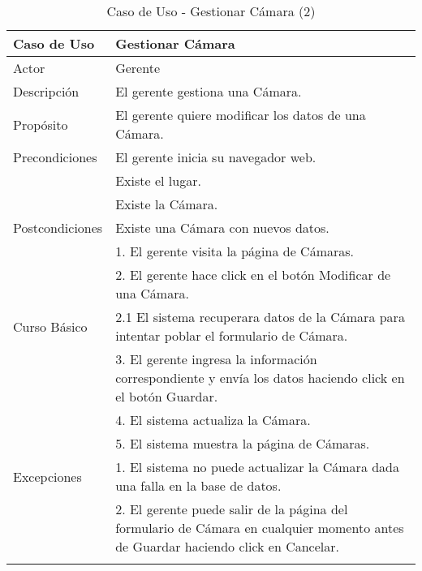 \begin{longtable}{@{} p{3cm} p{10cm} @{}} \toprule
    \textbf{Caso de Uso}    & Gestionar Cámara \\ \midrule
    Actor                   & Gerente \\ \cmidrule{1-2}
    Descripción             & El gerente gestiona una Cámara. \\ \cmidrule{1-2}
    Propósito               & El gerente quiere modificar los datos de una Cámara. \\ \cmidrule{1-2}
    Precondiciones          & El gerente inicia su navegador web. \\
                            & Existe el lugar. \\
                            & Existe la Cámara. \\ \cmidrule{1-2} 
    Postcondiciones         & Existe una Cámara con nuevos datos. \\ \cmidrule{1-2} 
                            & 1. El gerente visita la página de Cámaras. \\ 
                            & 2. El gerente hace click en el botón Modificar de una Cámara. \\
   Curso Básico             & 2.1 El sistema recuperara datos de la Cámara para intentar poblar el formulario de Cámara. \\
                            & 3. El gerente ingresa la información correspondiente y envía los datos haciendo click en el botón Guardar. \\
                            & 4. El sistema actualiza la Cámara. \\ 
                            & 5. El sistema muestra la página de Cámaras. \\ \cmidrule{1-2}
    Excepciones             & 1. El sistema no puede actualizar la Cámara dada una falla en la base de datos. \\
                            & 2. El gerente puede salir de la página del formulario de Cámara en cualquier momento antes de Guardar haciendo click en Cancelar. \\ \bottomrule
   \caption{Caso de Uso - Gestionar Cámara (2)} \label{tab:tabcu-cam2} \\
   \end{longtable}



